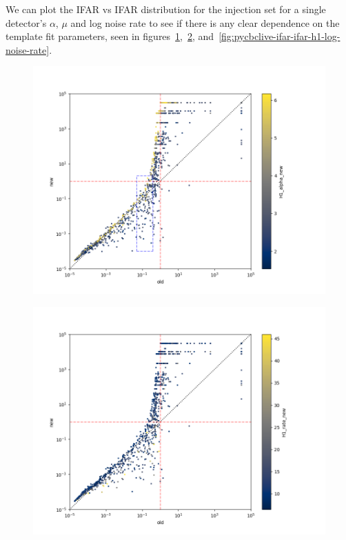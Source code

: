 We can plot the IFAR vs IFAR distribution for the injection set for a single detector's $\alpha$, $\mu$ and log noise rate to see if there is any clear dependence on the template fit parameters, seen in figures~\ref{fig:pycbclive-ifar-ifar-h1-alpha},~\ref{fig:pycbclive-ifar-ifar-h1-rate}, and~\ref{fig:pycbclive-ifar-ifar-h1-log-noise-rate}.
%
\begin{figure}
    \centering
    \includegraphics[width=\textwidth]{images/5_pycbclive/all_full_h1_alpha.png}
    \caption{}
    \label{fig:pycbclive-ifar-ifar-h1-alpha}
\end{figure}
%
\begin{figure}
    \centering
    \includegraphics[width=\textwidth]{images/5_pycbclive/all_full_h1_rate.png}
    \caption{}
    \label{fig:pycbclive-ifar-ifar-h1-rate}
\end{figure}
